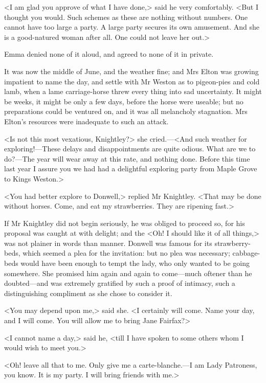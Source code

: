 <I am glad you approve of what I have done,> said he very comfortably. <But I thought you would. Such schemes as these are nothing without numbers. One cannot have too large a party. A large party secures its own amusement. And she is a good-natured woman after all. One could not leave her out.>

Emma denied none of it aloud, and agreed to none of it in private.

It was now the middle of June, and the weather fine; and Mrs Elton was growing impatient to name the day, and settle with Mr Weston as to pigeon-pies and cold lamb, when a lame carriage-horse threw every thing into sad uncertainty. It might be weeks, it might be only a few days, before the horse were useable; but no preparations could be ventured on, and it was all melancholy stagnation. Mrs Elton's resources were inadequate to such an attack.

<Is not this most vexatious, Knightley?> she cried.—<And such weather for exploring!—These delays and disappointments are quite odious. What are we to do?—The year will wear away at this rate, and nothing done. Before this time last year I assure you we had had a delightful exploring party from Maple Grove to Kings Weston.>

<You had better explore to Donwell,> replied Mr Knightley. <That may be done without horses. Come, and eat my strawberries. They are ripening fast.>

If Mr Knightley did not begin seriously, he was obliged to proceed so, for his proposal was caught at with delight; and the <Oh! I should like it of all things,> was not plainer in words than manner. Donwell was famous for its strawberry-beds, which seemed a plea for the invitation: but no plea was necessary; cabbage-beds would have been enough to tempt the lady, who only wanted to be going somewhere. She promised him again and again to come—much oftener than he doubted—and was extremely gratified by such a proof of intimacy, such a distinguishing compliment as she chose to consider it.

<You may depend upon me,> said she. <I certainly will come. Name your day, and I will come. You will allow me to bring Jane Fairfax?>

<I cannot name a day,> said he, <till I have spoken to some others whom I would wish to meet you.>

<Oh! leave all that to me. Only give me a carte-blanche.—I am Lady Patroness, you know. It is my party. I will bring friends with me.>

